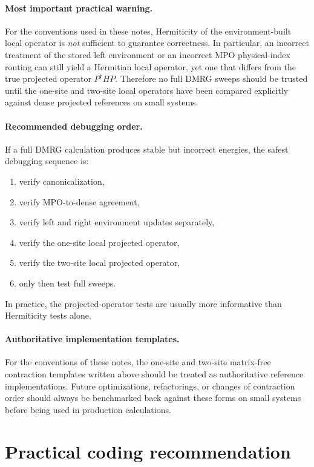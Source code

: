 \documentclass[aps,prb,onecolumn,nofootinbib]{revtex4-2}
\begin{document}
	\paragraph{Most important practical warning.}
	For the conventions used in these notes, Hermiticity of the environment-built local operator
	is \emph{not} sufficient to guarantee correctness. In particular, an incorrect treatment of the
	stored left environment or an incorrect MPO physical-index routing can still yield a Hermitian
	local operator, yet one that differs from the true projected operator \(P^\dagger H P\).
	Therefore no full DMRG sweeps should be trusted until the one-site and two-site local operators
	have been compared explicitly against dense projected references on small systems.
	
	\paragraph{Recommended debugging order.}
	If a full DMRG calculation produces stable but incorrect energies, the safest debugging sequence is:
	\begin{enumerate}
		\item verify canonicalization,
		\item verify MPO-to-dense agreement,
		\item verify left and right environment updates separately,
		\item verify the one-site local projected operator,
		\item verify the two-site local projected operator,
		\item only then test full sweeps.
	\end{enumerate}
	In practice, the projected-operator tests are usually more informative than Hermiticity tests alone.
	
	\paragraph{Authoritative implementation templates.}
	For the conventions of these notes, the one-site and two-site matrix-free contraction templates
	written above should be treated as authoritative reference implementations. Future optimizations,
	refactorings, or changes of contraction order should always be benchmarked back against these
	forms on small systems before being used in production calculations.
	
	\section{Practical coding recommendation}
	
\end{document}
